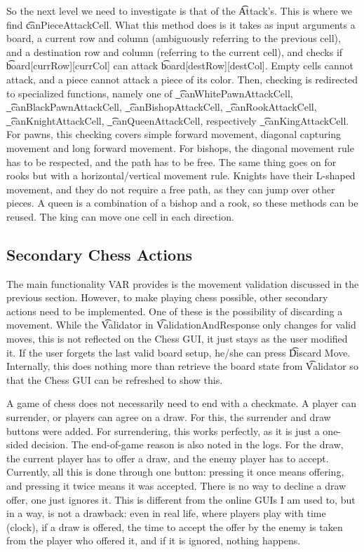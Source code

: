 So the next level we need to investigate is that of the \t{Attack}'s. This is where we find \t{canPieceAttackCell}. What this method does is it takes as input arguments a board, a current row and column (ambiguously referring to the previous cell), and a destination row and column (referring to the current cell), and checks if \t{board[currRow][currCol]} can attack \t{board[destRow][destCol]}. Empty cells cannot attack, and a piece cannot attack a piece of its color. Then, checking is redirected to specialized functions, namely one of \t{\_canWhitePawnAttackCell}, \t{\_canBlackPawnAttackCell}, \t{\_canBishopAttackCell}, \t{\_canRookAttackCell}, \t{\_canKnightAttackCell}, \t{\_canQueenAttackCell}, respectively \t{\_canKingAttackCell}. For pawns, this checking covers simple forward movement, diagonal capturing movement and long forward movement. For bishops, the diagonal movement rule has to be respected, and the path has to be free. The same thing goes on for rooks but with a horizontal/vertical movement rule. Knights have their L-shaped movement, and they do not require a free path, as they can jump over other pieces. A queen is a combination of a bishop and a rook, so these methods can be reused. The king can move one cell in each direction.



\subsection{Secondary Chess Actions}

The main functionality VAR provides is the movement validation discussed in the previous section. However, to make playing chess possible, other secondary actions need to be implemented. One of these is the possibility of discarding a movement. While the \t{Validator} in \t{ValidationAndResponse} only changes for valid moves, this is not reflected on the Chess GUI, it just stays as the user modified it. If the user forgets the last valid board setup, he/she can press \t{Discard Move}. Internally, this does nothing more than retrieve the board state from \t{Validator} so that the Chess GUI can be refreshed to show this.

A game of chess does not necessarily need to end with a checkmate. A player can surrender, or players can agree on a draw. For this, the surrender and draw buttons were added. For surrendering, this works perfectly, as it is just a one-sided decision. The end-of-game reason is also noted in the logs. For the draw, the current player has to offer a draw, and the enemy player has to accept. Currently, all this is done through one button: pressing it once means offering, and pressing it twice means it was accepted. There is no way to decline a draw offer, one just ignores it. This is different from the online GUIs I am used to, but in a way, is not a drawback: even in real life, where players play with time (clock), if a draw is offered, the time to accept the offer by the enemy is taken from the player who offered it, and if it is ignored, nothing happens.


